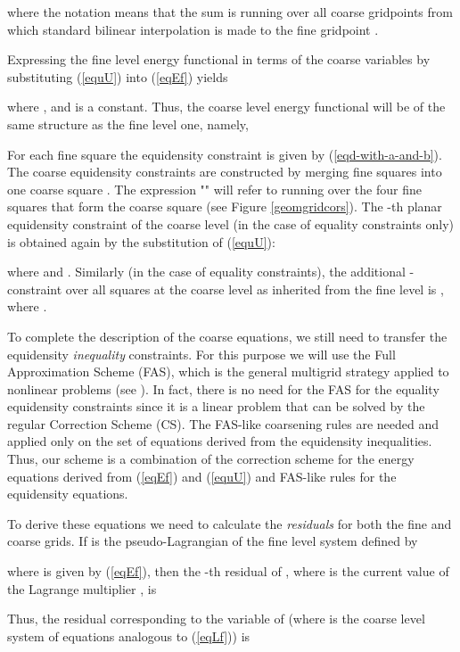 \documentclass[final]{siamltex}
\begin{document}
where the notation  means that the sum is running
over all coarse gridpoints  from which standard bilinear
interpolation is made to the fine gridpoint .
\par Expressing the fine level energy
functional  in terms of the coarse variables by substituting
(\ref{equU}) into (\ref{eqEf}) yields

where ,
 and  is a constant. Thus, the coarse level energy
functional will be of the same structure as the fine level one,
namely,

\par For each fine square  the equidensity constraint  is
given by (\ref{eqd-with-a-and-b}).
The coarse equidensity constraints are constructed by merging
 fine squares into one coarse square .
The expression "" will refer to running over the four fine
squares  that form the coarse square  (see Figure
\ref{geomgridcors}). The -th planar equidensity constraint  of
the coarse level (in the case of equality constraints only) is
obtained again by the substitution of (\ref{equU}):

where  and
. Similarly (in
the case of equality constraints), the additional
-constraint over all squares at the coarse level as
inherited from the fine level is , where
.
\par To complete the description of the coarse equations, we still need to transfer the equidensity {\it
inequality}
constraints.
For this purpose we will use the Full Approximation Scheme (FAS),
which is the general multigrid strategy applied to nonlinear
problems (see \cite{Brandt:1977:MLAa,vlsicad,mgbooktrott}). In
fact, there is no need for the FAS for the equality equidensity
constraints since it is a linear problem that can be solved by the
regular Correction Scheme (CS). The FAS-like coarsening rules are
needed and applied only on the set of equations derived from the
equidensity inequalities. Thus, our scheme is a combination of the
correction scheme for the energy equations derived from
(\ref{eqEf}) and (\ref{equU}) and FAS-like rules for the
equidensity equations.
\par To derive these equations we need to calculate the
{\it residuals} for both the fine and coarse grids. If  is
the pseudo-Lagrangian of the fine level system defined by

where  is given by (\ref{eqEf}), then the
-th residual of , where
 is the current value of the Lagrange
multiplier , is

Thus, the residual corresponding to the variable  of
 (where  is the coarse level system
of equations analogous to (\ref{eqLf})) is
\end{document}
